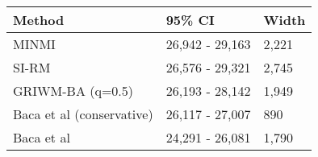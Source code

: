 
\begin{tabular}{lll}
\toprule
Method & 95\% CI & Width\\
\midrule
MINMI & 26,942 - 29,163 & 2,221\\
SI-RM & 26,576 - 29,321 & 2,745\\
GRIWM-BA (q=0.5) & 26,193 - 28,142 & 1,949\\
Baca et al (conservative) & 26,117 - 27,007 & 890\\
Baca et al & 24,291 - 26,081 & 1,790\\
\bottomrule
\end{tabular}
